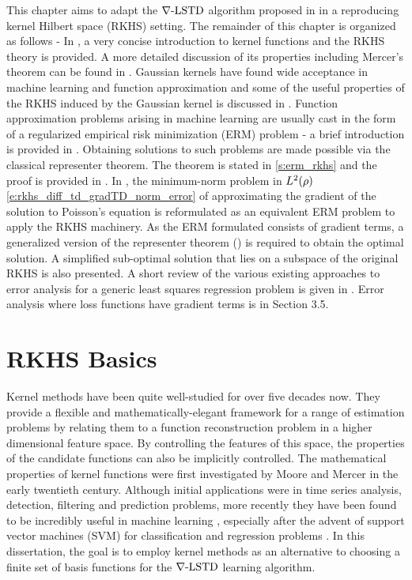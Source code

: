 This chapter aims to adapt the $\nabla\text{-LSTD}$ algorithm proposed in  in a reproducing kernel Hilbert space (RKHS) setting.  The remainder of this chapter is organized as follows - In , a very concise introduction to kernel functions and the RKHS theory is provided. A more detailed discussion of its properties including Mercer's theorem can be found in . Gaussian kernels have found wide acceptance in machine learning and function approximation and some of the useful properties of the RKHS induced by the Gaussian kernel is discussed in . Function approximation problems arising in machine learning are usually cast in the form of a regularized empirical risk minimization (ERM) problem - a brief introduction is provided in . Obtaining solutions to such problems are made possible via the classical representer theorem. The theorem is stated in \ref{s:erm_rkhs} and the proof is provided in . In , the minimum-norm problem in $L^2(\rho)$ \eqref{e:rkhs_diff_td_gradTD_norm_error} of approximating the gradient of the solution to Poisson's equation is reformulated as an equivalent ERM problem to apply the RKHS machinery. As the ERM formulated consists of gradient terms, a generalized  version of the representer theorem () is required to obtain the optimal solution.  A simplified sub-optimal solution that lies on a subspace of the original RKHS is also presented. A short review of the various existing approaches to error analysis for a generic least squares regression problem is given  in . Error analysis where loss functions have gradient terms is in Section 3.5.

\section{RKHS Basics}
\label{s:rkhs_basics}
Kernel methods have been quite well-studied for over five decades now. They provide a flexible and mathematically-elegant framework for a range of estimation problems by relating them to a function reconstruction problem in a higher dimensional feature space. By controlling the features of this space, the properties of the candidate functions can also be implicitly controlled. The mathematical properties of kernel functions were first investigated by Moore \cite{moo1916} and Mercer \cite{merrus09} in the early twentieth century. Although initial applications were in time series analysis, detection, filtering and prediction problems, more recently they have been found to be incredibly useful in machine learning \cite{wah90}, especially after the advent of support vector machines (SVM) for classification and regression problems \cite{corvap95, drucburkaufsmovap97}. In this dissertation, the goal is to employ kernel methods as an alternative to choosing a finite set of basis functions for the $\nabla\text{-LSTD}$ learning algorithm. 

